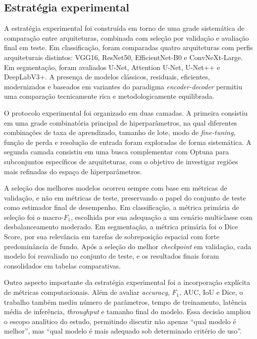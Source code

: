 \documentclass[tcc,capa]{texufpel}
\begin{document}
\subsection{Estratégia experimental}

A estratégia experimental foi construída em torno de uma grade sistemática de comparação entre arquiteturas, combinada com seleção por validação e avaliação final em teste. Em classificação, foram comparadas quatro arquiteturas com perfis arquiteturais distintos: VGG16, ResNet50, EfficientNet-B0 e ConvNeXt-Large. Em segmentação, foram avaliados U-Net, Attention U-Net, U-Net++ e DeepLabV3+. A presença de modelos clássicos, residuais, eficientes, modernizados e baseados em variantes do paradigma \textit{encoder-decoder} permitiu uma comparação tecnicamente rica e metodologicamente equilibrada.

O protocolo experimental foi organizado em duas camadas. A primeira consistiu em uma grade combinatória principal de hiperparâmetros, na qual diferentes combinações de taxa de aprendizado, tamanho de lote, modo de \textit{fine-tuning}, função de perda e resolução de entrada foram exploradas de forma sistemática. A segunda camada consistiu em uma busca complementar com Optuna para subconjuntos específicos de arquiteturas, com o objetivo de investigar regiões mais refinadas do espaço de hiperparâmetros.

A seleção dos melhores modelos ocorreu sempre com base em métricas de validação, e não em métricas de teste, preservando o papel do conjunto de teste como estimador final de desempenho. Em classificação, a métrica primária de seleção foi o macro-\(F_1\), escolhida por sua adequação a um cenário multiclasse com desbalanceamento moderado. Em segmentação, a métrica primária foi o Dice Score, por sua relevância em tarefas de sobreposição espacial com forte predominância de fundo. Após a seleção do melhor \textit{checkpoint} em validação, cada modelo foi reavaliado no conjunto de teste, e os resultados finais foram consolidados em tabelas comparativas.

Outro aspecto importante da estratégia experimental foi a incorporação explícita de métricas computacionais. Além de avaliar \textit{accuracy}, \(F_1\), AUC, IoU e Dice, o trabalho também mediu número de parâmetros, tempo de treinamento, latência média de inferência, \textit{throughput} e tamanho final do modelo. Essa decisão ampliou o escopo analítico do estudo, permitindo discutir não apenas “qual modelo é melhor”, mas “qual modelo é mais adequado sob determinado critério de uso”.
\end{document}
